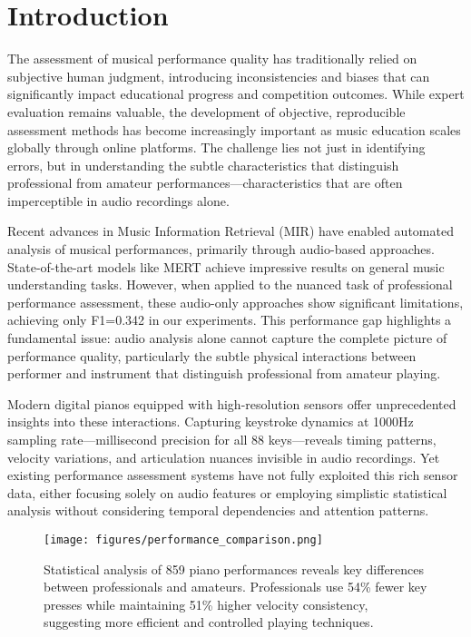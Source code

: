 \section{Introduction}

The assessment of musical performance quality has traditionally relied on subjective human judgment, introducing inconsistencies and biases that can significantly impact educational progress and competition outcomes.
While expert evaluation remains valuable, the development of objective, reproducible assessment methods has become increasingly important as music education scales globally through online platforms.
The challenge lies not just in identifying errors, but in understanding the subtle characteristics that distinguish professional from amateur performances—characteristics that are often imperceptible in audio recordings alone.

Recent advances in Music Information Retrieval (MIR) have enabled automated analysis of musical performances, primarily through audio-based approaches.
State-of-the-art models like MERT achieve impressive results on general music understanding tasks.
However, when applied to the nuanced task of professional performance assessment, these audio-only approaches show significant limitations, achieving only F1=0.342 in our experiments.
This performance gap highlights a fundamental issue: audio analysis alone cannot capture the complete picture of performance quality, particularly the subtle physical interactions between performer and instrument that distinguish professional from amateur playing.

Modern digital pianos equipped with high-resolution sensors offer unprecedented insights into these interactions.
Capturing keystroke dynamics at 1000Hz sampling rate—millisecond precision for all 88 keys—reveals timing patterns, velocity variations, and articulation nuances invisible in audio recordings.
Yet existing performance assessment systems have not fully exploited this rich sensor data, either focusing solely on audio features or employing simplistic statistical analysis without considering temporal dependencies and attention patterns.

\begin{figure}[h]
  \centering
  \texttt{[image: figures/performance\_comparison.png]}
  \caption{Statistical analysis of 859 piano performances reveals key differences between professionals and amateurs. 
  Professionals use 54\% fewer key presses while maintaining 51\% higher velocity consistency, suggesting more efficient and controlled playing techniques.}
  \Description{}
  \label{fig:performance_comparison}
\end{figure}

